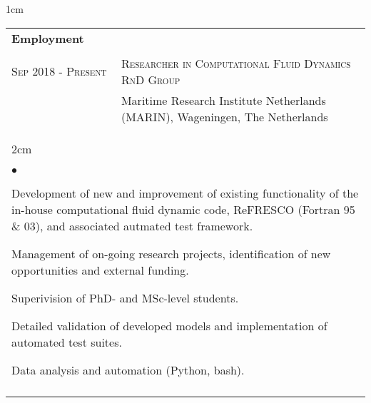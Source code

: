 \documentclass[a4paper,10pt]{article}
\newcommand{\squishlist}{
	\begin{list}{$\bullet$}
	{
		\setlength{\itemsep}{0pt}
		\setlength{\parsep}{0pt}
		\setlength{\topsep}{0pt}
		\setlength{\partopsep}{0pt}
		\setlength{\leftmargin}{2em}
		\setlength{\labelwidth}{1.5em}
		\setlength{\labelsep}{0.5em}
	}
}
\newcommand{\squishend}{\end{list}}
\begin{document}
\begin{minipage}{\textwidth}
\begin{adjustwidth}{}{1cm}

\begin{tabular}{p{3.5cm} p{12.9cm}}

\textbf{Employment} \\
\\

\textsc{Sep 2018 - Present} & \textsc{Researcher in Computational Fluid Dynamics RnD Group} \\
							& Maritime Research Institute Netherlands (MARIN), Wageningen, The Netherlands \vspace{0.1cm} \\
%
\multicolumn{2}{l}{
\hspace{1cm}\begin{minipage}[t]{\textwidth}
\begin{adjustwidth}{}{2cm}
\squishlist
	\item Development of new and improvement of existing functionality of the in-house
		computational fluid dynamic code, ReFRESCO (Fortran 95 \& 03), and associated autmated test framework.
	\item Management of on-going research projects, identification of new opportunities and external funding.
	\item Superivision of PhD- and MSc-level students.
	\item Detailed validation of developed models and implementation of automated test suites.
	\item Data analysis and automation (Python, bash).
\squishend
\end{adjustwidth}
\end{minipage}
} \\
\\


\end{tabular}
\end{adjustwidth}
\end{minipage}
\end{document}

